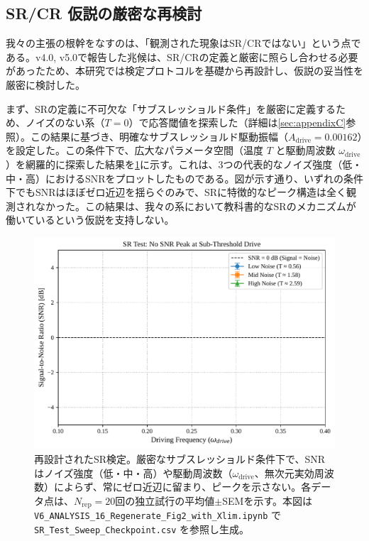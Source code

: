 \documentclass[a4paper,11pt,ja=standard,lualatex]{bxjsarticle}
\newcommand{\figref}[1]{\cref{#1}}
\newcommand{\secref}[1]{\cref{#1}}
\begin{document}
\FloatBarrier

\subsection{SR/CR 仮説の厳密な再検討}
我々の主張の根幹をなすのは、「観測された現象はSR/CRではない」という点である。v4.0, v5.0で報告した兆候は、SR/CRの定義と厳密に照らし合わせる必要があったため、本研究では検定プロトコルを基礎から再設計し、仮説の妥当性を厳密に検討した。

 まず、SRの定義に不可欠な「サブスレッショルド条件」を厳密に定義するため、ノイズのない系（$T=0$）で応答閾値を探索した（詳細は\secref{sec:appendixC}参照）。この結果に基づき、明確なサブスレッショルド駆動振幅（$A_{\mathrm{drive}}=0.00162$）を設定した。この条件下で、広大なパラメータ空間（温度 $T$ と駆動周波数 $\omega_{\mathrm{drive}}$）を網羅的に探索した結果を\figref{fig:sr_test_revised}に示す。これは、3つの代表的なノイズ強度（低・中・高）におけるSNRをプロットしたものである。図が示す通り、いずれの条件下でもSNRはほぼゼロ近辺を揺らぐのみで、SRに特徴的なピーク構造は全く観測されなかった。この結果は、我々の系において教科書的なSRのメカニズムが働いているという仮説を支持しない。

\begin{figure}[H]
\centering
\includegraphics[width=0.8\linewidth]{v6_fig02a_revised_SR_Test_LinePlot_corrected.pdf}
\caption{再設計されたSR検定。厳密なサブスレッショルド条件下で、SNRはノイズ強度（低・中・高）や駆動周波数（$\omega_{\mathrm{drive}}$、無次元実効周波数）によらず、常にゼロ近辺に留まり、ピークを示さない。各データ点は、$N_{\mathrm{rep}}=20$回の独立試行の平均値$\pm$SEMを示す。本図は \texttt{V6\_ANALYSIS\_16\_Regenerate\_Fig2\_with\_Xlim.ipynb} で \texttt{SR\_Test\_Sweep\_Checkpoint.csv} を参照し生成。}
\label{fig:sr_test_revised}
\end{figure}
\end{document}

